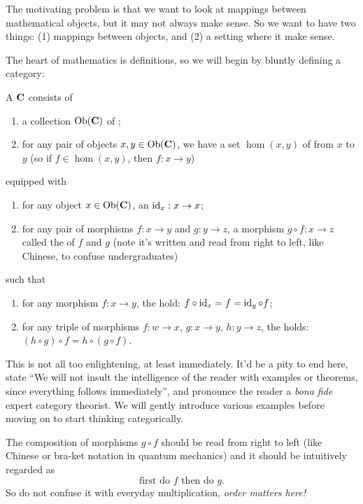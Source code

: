 The motivating problem is that we want to look at mappings 
between mathematical objects, but it may not always make sense.
So we want to have two things: (1) mappings between objects, and 
(2) a setting where it make sense.

The heart of mathematics is definitions, so we will begin by
bluntly defining a category:
\begin{framed}
\begin{defn}\label{defn:category}
A  $\mathbf{C}$ consists of
\begin{enumerate}
\item a collection $\operatorname{Ob}(\mathbf{C})$ of ;
\item for any pair of objects $x,y\in\operatorname{Ob}(\mathbf{C})$, we have a set
  $\hom(x,y)$ of  from $x$ to $y$ (so if
  $f\in\hom(x,y)$, then $f:x\to y$)
\end{enumerate}
equipped with
\begin{enumerate}
\item for any object $x\in\operatorname{Ob}(\mathbf{C})$, an 
  $\operatorname{id}_{x}:x\to x$;
\item for any pair of morphisms $f:x\to y$ and $g:y\to z$, a
  morphism $g\circ f:x\to z$ called the  of
  $f$ and $g$ (note it's written and read from right to left,
  like Chinese, to confuse undergraduates)
\end{enumerate}
such that
\begin{enumerate}
\item for any morphism $f:x\to y$, the  hold: $f\circ\operatorname{id}_{x}=f=\operatorname{id}_{y}\circ f$;
\item for any triple of morphisms $f:w\to x$, $g:x\to y$, $h:y\to
  z$, the  holds: $(h\circ g)\circ f=h\circ(g\circ f)$.
\end{enumerate}
\end{defn}
\end{framed}
This is not all too enlightening, at least immediately. It'd be a
pity to end here, state ``We will not insult the intelligence of
the reader with examples or theorems, since everything follows
immediately'', and pronounce the reader a \emph{bona fide} expert
category theorist. We will gently introduce various examples before
moving on to start thinking categorically.

\begin{rmk}
The composition of morphisms $g\circ f$ should be read from right
to left (like Chinese or bra-ket notation in quantum mechanics)
and it should be intuitively regarded as
\begin{equation}%
\text{first do } f \text{ then do }g.
\end{equation}
So do not confuse it with everyday multiplication, \emph{order matters here!}
\end{rmk}

